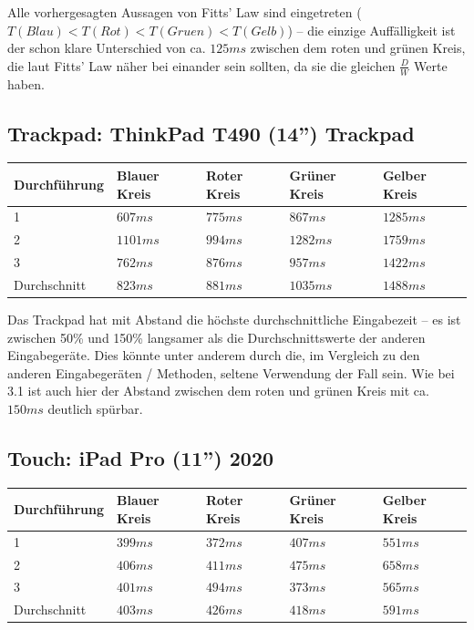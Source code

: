 \documentclass{article}
\begin{document}
Alle vorhergesagten Aussagen von Fitts' Law sind eingetreten ($T(Blau) < T(Rot)
< T(Gruen) < T(Gelb)$) – die einzige Auffälligkeit ist der schon klare Unterschied
von ca. $125ms$ zwischen dem roten und grünen Kreis, die laut Fitts' Law näher bei
einander sein sollten, da sie die gleichen $\frac{D}{W}$ Werte haben.

\subsection{Trackpad: ThinkPad T490 (14'') Trackpad}

\vspace{0.5em}

\begin{tabularx}{\textwidth}{|X|X|X|X|X|}
	\hline
	Durchführung & Blauer Kreis & Roter Kreis & Grüner Kreis & Gelber Kreis \\
	\hline
	1            & $607ms$      & $775ms$     & $867ms$      & $1285ms$     \\
	\hline
	2            & $1101ms$     & $994ms$     & $1282ms$     & $1759ms$     \\
	\hline
	3            & $762ms$      & $876ms$     & $957ms$      & $1422ms$     \\
	\hline
	\hline
	Durchschnitt & $823ms$      & $881ms$     & $1035ms$     & $1488ms$     \\
	\hline
\end{tabularx}

\vspace{0.5em}

Das Trackpad hat mit Abstand die höchste durchschnittliche Eingabezeit – es ist
zwischen 50\% und 150\% langsamer als die Durchschnittswerte der anderen
Eingabegeräte. Dies könnte unter anderem durch die, im Vergleich zu den anderen
Eingabegeräten / Methoden, seltene Verwendung der Fall sein. Wie bei 3.1 ist auch
hier der Abstand zwischen dem roten und grünen Kreis mit ca. $150ms$ deutlich
spürbar.

\subsection{Touch: iPad Pro (11'') 2020}

\vspace{0.5em}

\begin{tabularx}{\textwidth}{|X|X|X|X|X|}
	\hline
	Durchführung & Blauer Kreis & Roter Kreis & Grüner Kreis & Gelber Kreis \\
	\hline
	1            & $399ms$      & $372ms$     & $407ms$      & $551ms$      \\
	\hline
	2            & $406ms$      & $411ms$     & $475ms$      & $658ms$      \\
	\hline
	3            & $401ms$      & $494ms$     & $373ms$      & $565ms$      \\
	\hline
	\hline
	Durchschnitt & $403ms$      & $426ms$     & $418ms$      & $591ms$      \\
	\hline
\end{tabularx}
\end{document}

